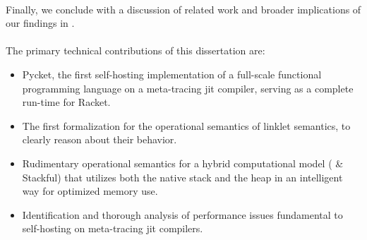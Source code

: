        \paragraph{}%
            Finally, we conclude with a discussion of related work and broader implications of our findings in .

        \paragraph{}%
            The primary technical contributions of this dissertation are:
            \begin{itemize}
                \item Pycket, the first self-hosting implementation of a full-scale functional programming language on a meta-tracing \gls{jit} compiler, serving as a complete run-time for Racket. %
                \item The first formalization for the operational semantics of linklet semantics, to clearly reason about their behavior. %
                \item Rudimentary operational semantics for a hybrid computational model ( \& Stackful) that utilizes both the native stack and the heap in an intelligent way for optimized memory use. %
                \item Identification and thorough analysis of performance issues fundamental to self-hosting on meta-tracing \gls{jit} compilers. %
            \end{itemize}






